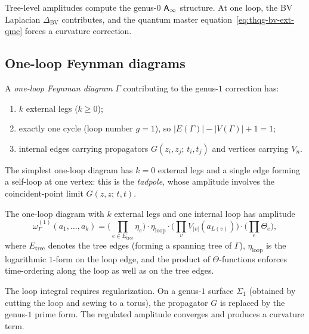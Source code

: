 \medskip
Tree-level amplitudes compute the genus-$0$ $\mathsf{A}_{\infty}$ structure.
At one loop, the BV Laplacian $\Delta_{\mathrm{BV}}$ contributes, and
the quantum master equation~\eqref{eq:thqg-bv-ext-qme} forces a
curvature correction.

\subsection{One-loop Feynman diagrams}

\begin{definition}
A \emph{one-loop Feynman diagram} $\Gamma$ contributing to the
genus-$1$ correction has:
\begin{enumerate}[label=(\roman*)]
\item $k$ external legs ($k \ge 0$);
\item exactly one cycle (loop number $g = 1$), so
 $|E(\Gamma)| - |V(\Gamma)| + 1 = 1$;
\item internal edges carrying propagators
 $G(z_i, z_j;\, t_i, t_j)$ and vertices carrying $V_n$.
\end{enumerate}
The simplest one-loop diagram has $k = 0$ external legs and a
single edge forming a self-loop at one vertex: this is the
\emph{tadpole}, whose amplitude involves the coincident-point
limit $G(z, z;\, t, t)$.
\end{definition}

\begin{proposition}
The one-loop diagram with $k$ external legs and one internal loop
has amplitude
\begin{equation}
\omega_\Gamma^{(1)}(a_1, \ldots, a_k)
= \biggl(\prod_{e \in E_{\mathrm{tree}}} \eta_e \biggr)
\cdot \eta_{\mathrm{loop}}
\cdot \biggl(\prod_v V_{|v|}(a_{L(v)})\biggr)
\cdot \biggl(\prod_e \Theta_e\biggr),
\end{equation}
where $E_{\mathrm{tree}}$ denotes the tree edges (forming a
spanning tree of $\Gamma$), $\eta_{\mathrm{loop}}$ is the
logarithmic $1$-form on the loop edge, and the product of
$\Theta$-functions enforces time-ordering along the loop as well
as on the tree edges.

The loop integral requires regularization. On a genus-$1$ surface
$\Sigma_1$ (obtained by cutting the loop and sewing to a torus),
the propagator $G$ is replaced by the genus-$1$ prime form. The
regulated amplitude converges and produces a curvature term.
\end{proposition}

